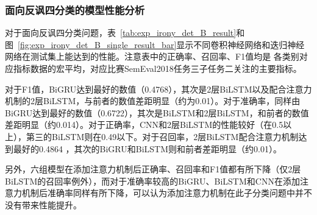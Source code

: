 \subsubsection{面向反讽四分类的模型性能分析}

对于面向反讽四分类问题，表~\ref{tab:exp_irony_det_B_result}和图~\ref{fig:exp_irony_det_B_single_result_bar}显示不同卷积神经网络和迭归神经网络在测试集上能达到的性能。注意表中的正确率、召回率、F1值均是
各类别对应指标数据的宏平均，对应比赛SemEval2018任务三子任务二关注的主要指标。

对于F1值，BiGRU达到最好的数值（0.4768），其次是2层BiLSTM以及配合注意力机制的2层BiLSTM，与前者的数值差距明显（约为0.01）。对于准确率，同样由BiGRU达到最好的数值（0.6722），其次是BiLSTM和2层BiLSTM，和前者的数值差距明显（约0.014）。对于正确率，CNN和2层BiLSTM的性能较好（在0.5以上），第三的BiLSTM则在0.49以下。对于召回率，2层BiLSTM配合注意力机制达到最好的0.4864 ，其次的BiGRU和BiLSTM则和前者差距明显（约0.01）。

另外，六组模型在添加注意力机制后正确率、召回率和F1值都有所下降（仅2层BiLSTM的召回率例外），而对于准确率较高的BiGRU、BiLSTM和CNN在添加注意力机制后准确率同样有所下降，可以认为添加注意力机制在此子分类问题中并不没有带来性能提升。

